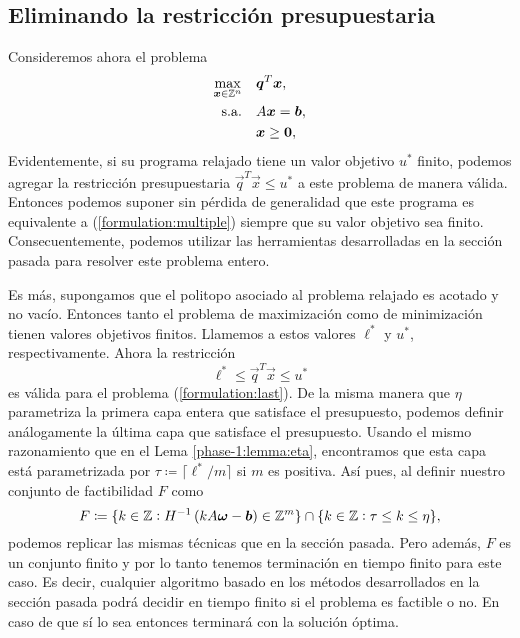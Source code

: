 \subsection{Eliminando la restricción presupuestaria}
\noindent
Consideremos ahora el problema
\begin{subequations}
	\label{formulation:last}
	\begin{align}
		\max_{\boldsymbol{x} \in \mathbb{Z}^n} \quad
			& \boldsymbol{q}^T\boldsymbol{x}, \label{formulation:last:objective} \\
		\text{s.a.} \quad
			& A\boldsymbol{x} = \boldsymbol{b}, \label{formulation:last:constraints} \\
			& \boldsymbol{x} \geq \boldsymbol{0}, \nonumber
	\end{align}
\end{subequations}
Evidentemente, si su programa relajado tiene un valor objetivo $u^*$ finito, podemos agregar la
restricción presupuestaria $\vec{q}^T\vec{x} \leq u^*$ a este problema de manera válida. Entonces
podemos suponer sin pérdida de generalidad que este programa es equivalente a
(\ref{formulation:multiple}) siempre que su valor objetivo sea finito. Consecuentemente, podemos
utilizar las herramientas desarrolladas en la sección pasada para resolver este problema entero.

Es más, supongamos que el politopo asociado al problema relajado es acotado y no vacío. Entonces
tanto el problema de maximización como de minimización tienen valores objetivos finitos. Llamemos a
estos valores $\ell^*$ y $u^*$, respectivamente. Ahora la restricción
\begin{equation*}
	\ell^* \leq \vec{q}^T\vec{x} \leq u^*
\end{equation*}
es válida para el problema (\ref{formulation:last}). De la misma manera que $\eta$ parametriza la
primera capa entera que satisface el presupuesto, podemos definir análogamente la última capa que
satisface el presupuesto. Usando el mismo razonamiento que en el Lema \ref{phase-1:lemma:eta},
encontramos que esta capa está parametrizada por $\tau \coloneq \lceil \ell^*/m \rceil$ si $m$ es
positiva. Así pues, al definir nuestro conjunto de factibilidad $F$ como
\begin{equation*}
	F \coloneq \lbrace k \in \mathbb{Z} \vcentcolon H^{-1}\left(kA\boldsymbol{\omega} - \boldsymbol{b}\right) \in \mathbb{Z}^m \rbrace
	\cap \lbrace k \in \mathbb{Z} \vcentcolon \tau \leq k \leq \eta \rbrace,
\end{equation*}
podemos replicar las mismas técnicas que en la sección pasada. Pero además, $F$ es un conjunto
finito y por lo tanto tenemos terminación en tiempo finito para este caso. Es decir, cualquier
algoritmo basado en los métodos desarrollados en la sección pasada podrá decidir en tiempo finito si
el problema es factible o no. En caso de que sí lo sea entonces terminará con la solución óptima.

